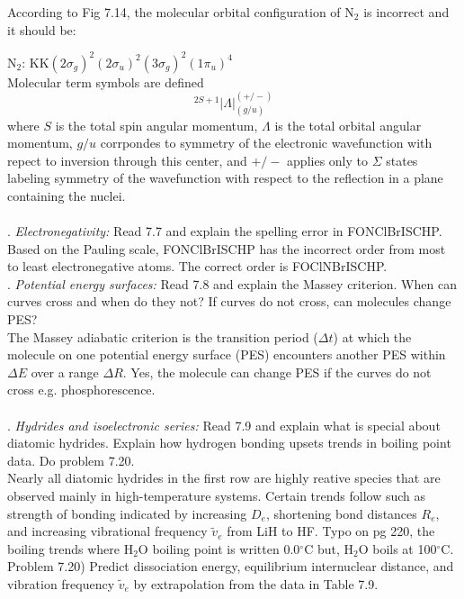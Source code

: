 \documentclass{article}
\begin{document}
  According to Fig 7.14, the molecular orbital configuration of N$_2$ is incorrect and it
  should be:

  N$_2$: KK$(2\sigma_g)^2(2\sigma_u)^2(3\sigma_g)^2(1\pi_u)^4$
  \\
  
  Molecular term symbols are defined
  \begin{equation*}
    ^{2S+1}|\Lambda|_{(g/u)}^{(+/-)}
  \end{equation*}
  \noindent where $S$ is the total spin angular momentum, $\Lambda$ is the total orbital
  angular momentum, $g/u$ corrpondes to symmetry of the electronic wavefunction with repect
  to inversion through this center, and $+/-$ applies only to $\Sigma$ states labeling
  symmetry of the wavefunction with respect to the reflection in a plane containing the
  nuclei. 
  \\
  \\
  . \textit{Electronegativity:} Read 7.7 and explain the spelling error in FONClBrISCHP.
  \\
  
  Based on the Pauling scale, FONClBrISCHP has the incorrect order from most to least electronegative
  atoms. The correct order is FOClNBrISCHP.
  \\
  
  . \textit{Potential energy surfaces:} Read 7.8 and explain the Massey criterion.
  When can curves cross and when do they not? If curves do not cross, can molecules change
  PES?
  \\
  
  The Massey adiabatic criterion is the transition period ($\Delta t$) at which the molecule
  on one potential energy surface (PES) encounters another PES within $\Delta E$ over a range
  $\Delta R$. Yes, the molecule can change PES if the curves do not cross e.g. phosphorescence.
  \\
  \\
  . \textit{Hydrides and isoelectronic series:} Read 7.9 and explain what is special
  about diatomic hydrides. Explain how hydrogen bonding upsets trends in boiling point
  data. Do problem 7.20.
  \\
  
  Nearly all diatomic hydrides in the first row are highly reative species that are
  observed mainly in high-temperature systems. Certain trends follow such as strength
  of bonding indicated by increasing $D_e$, shortening bond distances $R_e$, and
  increasing vibrational frequency $\tilde{v}_e$ from LiH to HF. Typo on pg 220, the
  boiling trends where H$_2$O boiling point is written 0.0$^{\circ}$C but, H$_2$O boils
  at 100$^{\circ}$C.  
  \\
  
  Problem 7.20) Predict dissociation energy, equilibrium internuclear distance,
  and vibration frequency $\tilde{v}_e$ by extrapolation from the data in Table 7.9.
\end{document}

